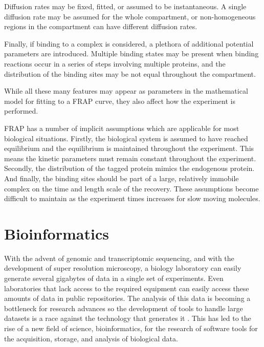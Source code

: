    Diffusion rates may be fixed, fitted, or assumed to be instantaneous.
    A single diffusion rate may be assumed for the whole
    compartment, or non-homogeneous regions in the compartment
    can have different diffusion rates.

    Finally, if binding to a complex is considered, a
    plethora of additional potential parameters are introduced.  Multiple
    binding states may be present when binding reactions occur in a
    series of steps involving multiple proteins, and the distribution of
    the binding sites may be not equal throughout the compartment.

    While all these many features may appear
    as parameters in the mathematical model for
    fitting to a FRAP curve, they also affect how the experiment is performed.

    FRAP has a number of implicit assumptions which are applicable
    for most biological situations.
    Firstly, the biological system is assumed to have
    reached equilibrium and the equilibrium
    is maintained throughout the experiment.
    This means the kinetic parameters
    must remain constant throughout the experiment.
    Secondly, the distribution of the tagged protein mimics the endogenous
    protein.
    And finally, the binding sites
    should be part of a large, relatively immobile
    complex on the time and length scale of the recovery.
    These assumptions become difficult to maintain as the experiment
    times increases for slow moving molecules.

\section{Bioinformatics}

  With the advent of genomic and transcriptomic
  sequencing, and with the development of super resolution microscopy,
  a biology laboratory can easily generate several gigabytes of data
  in a single set of experiments.
  Even laboratories that lack access to the required equipment can
  easily access these amounts of data in public repositories.
  The analysis of this data is becoming a bottleneck for research
  advances \citep{marx2013biology-big-data} so the development of
  tools to handle large datasets is a race against the technology that
  generates it \citep{delisi1988computers-molecular-biology}.
  This has led to the rise of a new field of science,
  bioinformatics, for the research of software tools for the
  acquisition, storage, and analysis of biological data.

